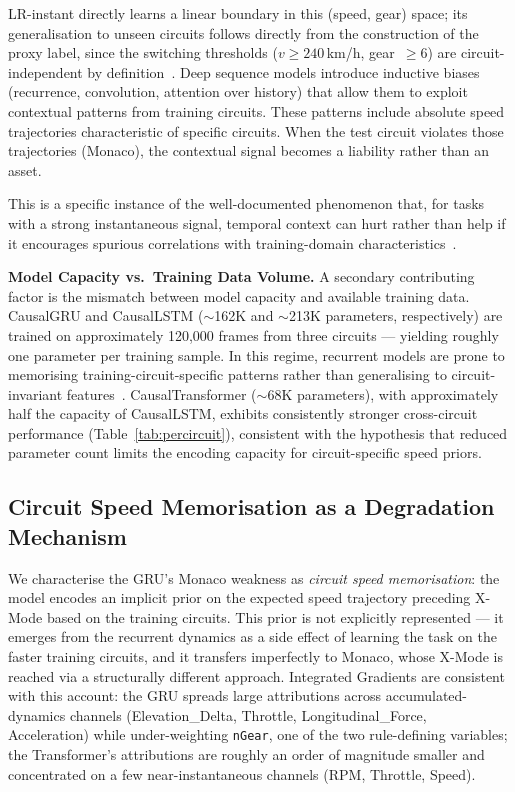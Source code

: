\documentclass[conference,a4paper]{IEEEtran}
\begin{document}
LR-instant directly learns a linear boundary in this (speed, gear) space; its
generalisation to unseen circuits follows directly from the construction of the
proxy label, since the switching thresholds ($v \geq 240$\,km/h, gear~$\geq 6$) are
circuit-independent by definition~\cite{ref_fia2026}.
Deep sequence models introduce inductive biases (recurrence, convolution, attention over
history) that allow them to exploit contextual patterns from training circuits.
These patterns include absolute speed trajectories characteristic of specific circuits.
When the test circuit violates those trajectories (Monaco), the contextual signal becomes
a liability rather than an asset.

This is a specific instance of the well-documented phenomenon that, for tasks with a
strong instantaneous signal, temporal context can hurt rather than help if it encourages
spurious correlations with training-domain characteristics~\cite{ref_dann}.

\textbf{Model Capacity vs.\ Training Data Volume.}
A secondary contributing factor is the mismatch between model capacity and available
training data. CausalGRU and CausalLSTM ($\sim$162K and $\sim$213K parameters,
respectively) are trained on approximately 120{,}000 frames from three circuits —
yielding roughly one parameter per training sample. In this regime, recurrent models are
prone to memorising training-circuit-specific patterns rather than generalising to
circuit-invariant features~\cite{ref_dann}. CausalTransformer ($\sim$68K parameters),
with approximately half the capacity of CausalLSTM, exhibits consistently stronger
cross-circuit performance (Table~\ref{tab:percircuit}), consistent with the hypothesis
that reduced parameter count limits the encoding capacity for circuit-specific speed priors.

\subsection{Circuit Speed Memorisation as a Degradation Mechanism}

We characterise the GRU's Monaco weakness as \emph{circuit speed memorisation}: the model
encodes an implicit prior on the expected speed trajectory preceding X-Mode based on the
training circuits.
This prior is not explicitly represented — it emerges from the recurrent dynamics as a
side effect of learning the task on the faster training circuits, and it transfers
imperfectly to Monaco, whose X-Mode is reached via a structurally different approach.
Integrated Gradients are consistent with this account: the GRU spreads large attributions
across accumulated-dynamics channels (Elevation\_Delta, Throttle, Longitudinal\_Force,
Acceleration) while under-weighting \texttt{nGear}, one of the two rule-defining variables;
the Transformer's attributions are roughly an order of magnitude smaller and concentrated
on a few near-instantaneous channels (RPM, Throttle, Speed).
\end{document}
